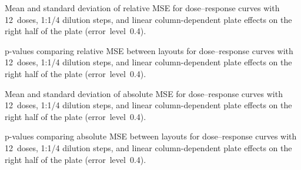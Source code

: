 \begin{table}[p]
    \centering
    \small
    
    \caption{Mean and standard deviation of relative \ECIC{} MSE for dose--response curves with 12~doses, 1:1/4 dilution steps, and linear column-dependent plate effects on the right half of the plate (error~level~0.4).}
    \label{tab:dr-relic50-mean-std-12doses-dil4-half-columns-neg-controls-0.4}
\end{table}

\begin{table}[p]
    \centering
    \small
    
    \caption{p-values comparing relative \ECIC{} MSE between layouts for dose--response curves with 12~doses, 1:1/4 dilution steps, and linear column-dependent plate effects on the right half of the plate (error~level~0.4).}
    \label{tab:dr-relic50-pvalues-12doses-dil4-half-columns-neg-controls-0.4}
\end{table}

\begin{table}[p]
    \centering
    \small
    
    \caption{Mean and standard deviation of absolute \ECIC{} MSE for dose--response curves with 12~doses, 1:1/4 dilution steps, and linear column-dependent plate effects on the right half of the plate (error~level~0.4).}
    \label{tab:dr-absic50-mean-std-12doses-dil4-half-columns-neg-controls-0.4}
\end{table}

\begin{table}[p]
    \centering
    \small
    
    \caption{p-values comparing absolute \ECIC{} MSE between layouts for dose--response curves with 12~doses, 1:1/4 dilution steps, and linear column-dependent plate effects on the right half of the plate (error~level~0.4).}
    \label{tab:dr-absic50-pvalues-12doses-dil4-half-columns-neg-controls-0.4}
\end{table}


